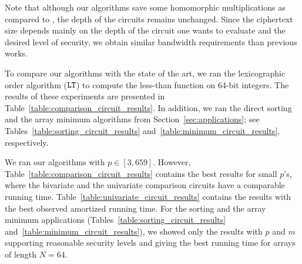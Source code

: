 Note that although our algorithms save some homomorphic multiplications as compared to \cite{TLWRK20}, the depth of the circuits remains unchanged. Since the ciphertext size depends mainly on the depth of the circuit one wants to evaluate and the desired level of security, we obtain similar bandwidth requirements than previous works.

To compare our algorithms with the state of the art, we ran the lexicographic order algorithm ($\mathtt{LT}$) to compute the less-than function on 64-bit integers.
The results of these experiments are presented in Table~\ref{table:comparison_circuit_results}.
In addition, we ran the direct sorting and the array minimum algorithms from Section~\ref{sec:applications}; see Tables~\ref{table:sorting_circuit_results} and~\ref{table:minimum_circuit_results}, respectively.

We ran our algorithms with $p \in [3,659]$.
However, Table~\ref{table:comparison_circuit_results} contains the best results for small $p$'s, where the bivariate and the univariate comparison circuits have a comparable running time.
Table~\ref{table:univariate_circuit_results} contains the results with the best observed amortized running time.
For the sorting and the array minimum applications (Tables~\ref{table:sorting_circuit_results} and~\ref{table:minimum_circuit_results}), we showed only the results with $p$ and $m$ supporting reasonable security levels and giving the best running time for arrays of length $N=64$.


